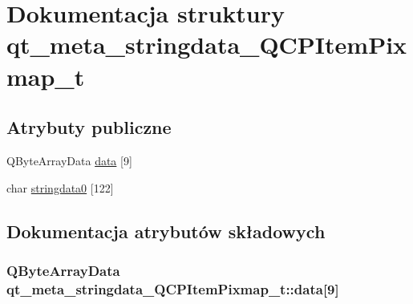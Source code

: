 \hypertarget{structqt__meta__stringdata___q_c_p_item_pixmap__t}{}\section{Dokumentacja struktury qt\+\_\+meta\+\_\+stringdata\+\_\+\+Q\+C\+P\+Item\+Pixmap\+\_\+t}
\label{structqt__meta__stringdata___q_c_p_item_pixmap__t}
\subsection*{Atrybuty publiczne}
\begin{DoxyCompactItemize}
\item 
Q\+Byte\+Array\+Data \hyperlink{structqt__meta__stringdata___q_c_p_item_pixmap__t_aef8aac1ad1d85c743f42d7ad8159bf41}{data} \mbox{[}9\mbox{]}
\item 
char \hyperlink{structqt__meta__stringdata___q_c_p_item_pixmap__t_aea88f01d1b77a98c2d9c3f2c64695c05}{stringdata0} \mbox{[}122\mbox{]}
\end{DoxyCompactItemize}


\subsection{Dokumentacja atrybutów składowych}
\subsubsection[{\texorpdfstring{data}{data}}]{\setlength{\rightskip}{0pt plus 5cm}Q\+Byte\+Array\+Data qt\+\_\+meta\+\_\+stringdata\+\_\+\+Q\+C\+P\+Item\+Pixmap\+\_\+t\+::data\mbox{[}9\mbox{]}}\hypertarget{structqt__meta__stringdata___q_c_p_item_pixmap__t_aef8aac1ad1d85c743f42d7ad8159bf41}{}\label{structqt__meta__stringdata___q_c_p_item_pixmap__t_aef8aac1ad1d85c743f42d7ad8159bf41}
